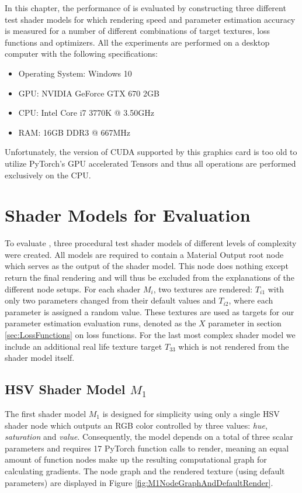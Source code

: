 In this chapter, the performance of \dipter{} is evaluated by constructing three different test shader models for which rendering speed and parameter estimation accuracy is measured for a number of different combinations of target textures, loss functions and optimizers. All the experiments are performed on a desktop computer with the following specifications:

\begin{itemize}
    \item Operating System: Windows 10
    \item GPU: NVIDIA GeForce GTX 670 2GB
    \item CPU: Intel Core i7 3770K @ 3.50GHz
    \item RAM: 16GB DDR3 @ 667MHz
\end{itemize}

Unfortunately, the version of CUDA supported by this graphics card is too old to utilize PyTorch's GPU accelerated Tensors and thus all operations are performed exclusively on the CPU.

\section{Shader Models for Evaluation}\label{sec:ShaderModelsForEvaluation}

To evaluate \dipter{}, three procedural test shader models of different levels of complexity were created. All models are required to contain a Material Output root node which serves as the output of the shader model. This node does nothing except return the final rendering and will thus be excluded from the explanations of the different node setups. For each shader $M_i$, two textures are rendered: $T_{i1}$ with only two parameters changed from their default values and $T_{i2}$, where each parameter is assigned a random value. These textures are used as targets for our parameter estimation evaluation runs, denoted as the $X$ parameter in section \ref{sec:LossFunctions} on loss functions. For the last most complex shader model we include an additional real life texture target $T_{33}$ which is not rendered from the shader model itself. 

\subsection{HSV Shader Model $M_1$}
The first shader model $M_1$ is designed for simplicity using only a single HSV shader node which outputs an RGB color controlled by three values: \textit{hue}, \textit{saturation} and \textit{value}. Consequently, the model depends on a total of three scalar parameters and requires 17 PyTorch function calls to render, meaning an equal amount of function nodes make up the resulting computational graph for calculating gradients. The node graph and the rendered texture (using default parameters) are displayed in Figure \ref{fig:M1NodeGraphAndDefaultRender}.

